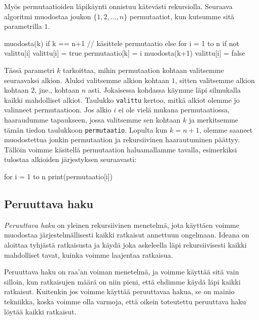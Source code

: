 Myös permutaatioiden läpikäynti onnistuu kätevästi rekursiolla.
Seuraava algoritmi muodostaa joukon $\{1,2,\dots,n\}$ permutaatiot,
kun kutsumme sitä parametrilla $1$.

\begin{code}
muodosta(k)
    if k == n+1
        // käsittele permutaatio
    else
        for i = 1 to n
            if not valittu[i]
                valittu[i] = true
                permutaatio[k] = i
                muodosta(k+1)
                valittu[i] = false
\end{code}

Tässä parametri $k$ tarkoittaa, mihin permutaation kohtaan
valitsemme seuraavaksi alkion.
Aluksi valitsemme alkion kohtaan $1$, sitten
valitsemme alkion kohtaan $2$, jne., kohtaan $n$ asti.
Jokaisessa kohdassa käymme läpi silmukalla kaikki mahdolliset alkiot.
Taulukko \texttt{valittu} kertoo, mitkä alkiot olemme jo valinneet
permutaatioon.
Jos alkio $i$ ei ole vielä mukana permutaatiossa, haaraudumme tapaukseen,
jossa valitsemme sen kohtaan $k$ ja merkitsemme tämän tiedon
taulukkoon \texttt{permutaatio}.
Lopulta kun $k=n+1$, olemme saaneet muodostettua jonkin permutaation
ja rekursiivinen haarautuminen päättyy.
Tällöin voimme käsitellä permutaation haluamallamme tavalla,
esimerkiksi tulostaa alkioiden järjestyksen seuraavasti:

\begin{code}
for i = 1 to n
    print(permutaatio[i])
\end{code}

\subsection{Peruuttava haku}

\emph{Peruuttava haku} on yleinen rekursiivinen menetelmä,
jota käyttäen voimme muodostaa järjestelmällisesti
kaikki ratkaisut annettuun ongelmaan.
Ideana on aloittaa tyhjästä ratkaisusta ja käydä
joka askeleella läpi rekursiivisesti kaikki mahdolliset tavat,
kuinka voimme laajentaa ratkaisua.

Peruuttava haku on raa'an voiman menetelmä,
ja voimme käyttää sitä vain silloin,
kun ratkaisujen määrä on niin pieni,
että ehdimme käydä läpi kaikki ratkaisut.
Kuitenkin jos voimme käyttää peruuttavaa hakua,
se on mainio tekniikka,
koska voimme olla varmoja, että oikein toteutettu
peruuttava haku löytää kaikki ratkaisut.

